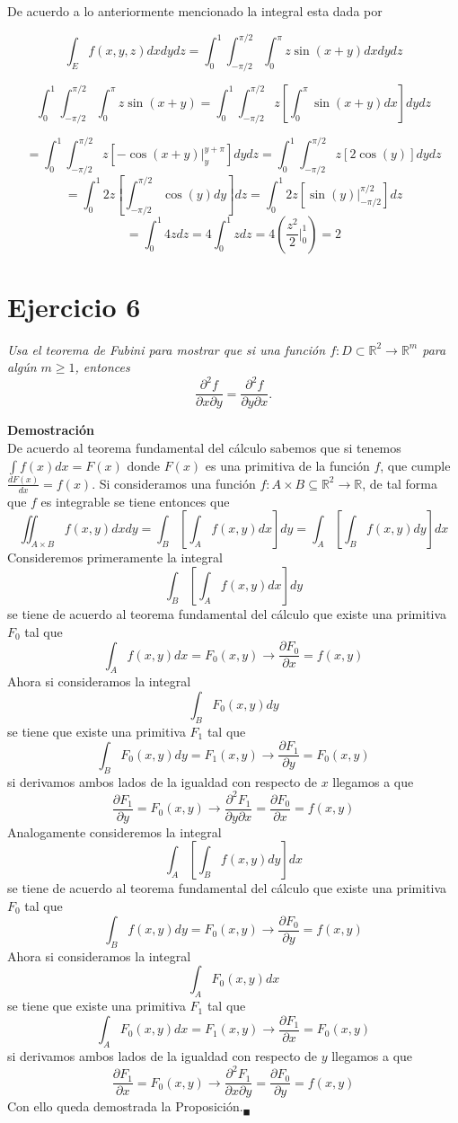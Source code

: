 \documentclass[a4paper,12pt]{article}
\begin{document}
De acuerdo a lo anteriormente mencionado la integral esta dada por

\[\int_{E} f(x,y,z)dxdydz = \int_{0}^{1} \int_{-\pi/2}^{\pi/2} \int_{0}^{\pi} z\sin (x+y) dxdydz\]

\[\int_{0}^{1} \int_{-\pi/2}^{\pi/2} \int_{0}^{\pi} z\sin (x+y) = \int_{0}^{1} \int_{-\pi/2}^{\pi/2} z \left[ \int_{0}^{\pi} \sin (x+y) dx \right] dydz \]

\[ = \int_{0}^{1} \int_{-\pi/2}^{\pi/2} z \left[ -\cos (x+y) \vert_{y}^{y + \pi} \right] dydz = \int_{0}^{1} \int_{-\pi/2}^{\pi/2} z \left[ 2\cos (y)\right] dydz\]
\[ = \int_{0}^{1} 2z\left[\int_{-\pi/2}^{\pi/2}  \cos (y) dy\right] dz =  \int_{0}^{1} 2z\left[\sin(y) \vert_{-\pi/2}^{\pi/2}\right] dz\]
\[ = \int_{0}^{1} 4z dz = 4 \int_{0}^{1} z dz = 4 (\frac{z^2}{2}\vert_{0}^1) = 2 \]

\newpage
\section{Ejercicio 6}
\textit{Usa el teorema de Fubini para mostrar que si una función $f : D \subset \mathbb{R}^2 \rightarrow \mathbb{R}^m$
para algún $m \geq 1$, entonces}
\[\frac{\partial^2 f}{\partial x \partial y} = \frac{\partial^2 f}{\partial y \partial x}.\]


\textbf{Demostración}\\
De acuerdo al teorema fundamental del cálculo sabemos que si tenemos $\int f(x) dx  = F(x)$ donde $F(x)$ es una
primitiva de la función $f$, que cumple $\frac{dF(x)}{dx} = f(x)$.
Si consideramos una función $f :A \times B \subseteq \mathbb{R}^2 \rightarrow \mathbb{R}$, de tal forma que $f$ es integrable
se tiene entonces que
\[\iint_{A\times B} f(x,y) dx dy = \int_{B}\left[\int_{A} f(x,y) dx\right]  dy  = \int_{A}\left[\int_{B} f(x,y) dy\right] dx\]
Consideremos primeramente la integral
\[ \int_{B}\left[\int_{A} f(x,y) dx\right]  dy \]
se tiene de acuerdo al  teorema fundamental del cálculo que existe una primitiva $F_0$ tal que
\[\int_{A} f(x,y) dx = F_0 (x,y) \longrightarrow \frac{\partial F_0}{\partial x} = f(x,y)\]
Ahora si consideramos la integral
\[ \int_{B} F_0 (x,y)  dy \]
se tiene que  existe una primitiva $F_1$ tal que
\[\int_{B} F_0 (x,y) dy = F_1 (x,y) \longrightarrow \frac{\partial F_1}{\partial y} = F_0 (x,y)\]
si derivamos ambos lados de la igualdad con respecto de $x$ llegamos a que
\[\frac{\partial F_1}{\partial y} = F_0 (x,y)  \longrightarrow \frac{\partial^2 F_1}{\partial y \partial x} = \frac{\partial F_0}{\partial x} = f(x,y) \]
Analogamente consideremos  la integral
\[ \int_{A}\left[\int_{B} f(x,y) dy\right]  dx \]
se tiene de acuerdo al  teorema fundamental del cálculo que existe una primitiva $F_0$ tal que
\[\int_{B} f(x,y) dy = F_0 (x,y) \longrightarrow \frac{\partial F_0}{\partial y} = f(x,y)\]
Ahora si consideramos la integral
\[ \int_{A} F_0 (x,y)  dx \]
se tiene que  existe una primitiva $F_1$ tal que
\[\int_{A} F_0 (x,y) dx = F_1 (x,y) \longrightarrow \frac{\partial F_1}{\partial x} = F_0 (x,y)\]
si derivamos ambos lados de la igualdad con respecto de $y$ llegamos a que
\[\frac{\partial F_1}{\partial x} = F_0 (x,y)  \longrightarrow \frac{\partial^2 F_1}{\partial x \partial y} = \frac{\partial F_0}{\partial y} = f(x,y) \]
Con ello queda demostrada la Proposición$._\blacksquare$
\end{document}
